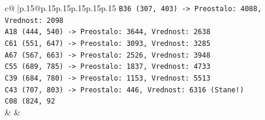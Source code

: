 \documentclass{article}
\begin{document}
{\begin{supertabular}{c@{$\;$}|p{.15\linewidth}@{}p{.15\linewidth}p{.15\linewidth}p{.15\linewidth}p{.15\linewidth}p{.15\linewidth}}
{{{\texttt{B36 (307, 403) {-}> Preostalo: 4088, Vrednost: 2098} \\
\texttt{A18 (444, 540) {-}> Preostalo: 3644, Vrednost: 2638} \\
\texttt{C61 (551, 647) {-}> Preostalo: 3093, Vrednost: 3285} \\
\texttt{A67 (567, 663) {-}> Preostalo: 2526, Vrednost: 3948} \\
\texttt{C55 (689, 785) {-}> Preostalo: 1837, Vrednost: 4733} \\
\texttt{C39 (684, 780) {-}> Preostalo: 1153, Vrednost: 5513} \\
\texttt{C43 (707, 803) {-}> Preostalo: 446, Vrednost: 6316 (Stane!)} \\
\texttt{C08 (824, 92} \\
            }
        }
    }
    & & \\ \\


\end{supertabular}}
\end{document}
